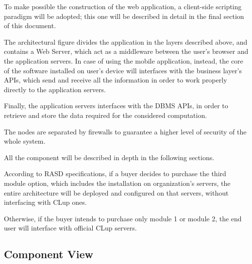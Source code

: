 \documentclass[table, 12pt]{article}
\begin{document}
To make possible the construction of the web application, a client-side scripting paradigm will be adopted; this one will be described in detail in the final section of this document.

The architectural figure divides the application in the layers described above, and contains a Web Server, which act as a middleware between the user's browser and the application servers.
In case of using the mobile application, instead, the core of the software installed on user's device will interfaces with the business layer's APIs, which send and receive all the information in order to work properly directly to the application servers.

Finally, the application servers interfaces with the DBMS APIs, in order to retrieve and store the data required for the considered computation.

The nodes are separated by firewalls to guarantee a higher level of security of the whole system.

All the component will be described in depth in the following sections.

According to RASD specifications, if a buyer decides to purchase the third module option, which includes the installation on organization's servers, the entire architecture will be deployed and configured on that servers, without interfacing with CLup ones.

Otherwise, if the buyer intends to purchase only module 1 or module 2, the end user will interface with official CLup servers.

\subsection{Component View}
\end{document}
